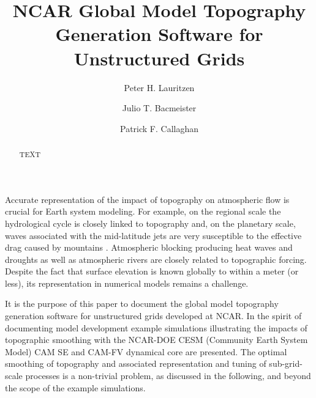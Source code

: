 \documentclass[gmd]{copernicus}
\begin{document}
\linenumbers

\title{NCAR Global Model Topography Generation Software for Unstructured Grids}

\author[1]{Peter H. Lauritzen}
\author[1]{Julio T. Bacmeister}
\author[1]{Patrick F. Callaghan}













\maketitle  %



\begin{abstract}
TEXT
\end{abstract}



\introduction  %
Accurate representation of the impact of topography on atmospheric flow is crucial for Earth system modeling.  For example, on the regional scale the hydrological cycle is closely linked to topography and, on the planetary scale, waves associated with the mid-latitude jets are very susceptible to the effective drag caused by mountains \citep[e.g., ][]{LM1997QJRMS}. Atmospheric blocking producing heat waves and droughts as well as atmospheric rivers are closely related to topographic forcing. Despite the fact that surface elevation is known globally to within a meter (or less), its representation in numerical models remains a challenge.

It is the purpose of this paper to document the global model topography generation software for unstructured grids developed at NCAR. In the spirit of documenting model development example simulations illustrating the impacts of topographic smoothing with the NCAR-DOE CESM (Community Earth System Model) CAM \citep[Community Atmosphere Model; ][]{CAM5} SE \cite[Spectral Element; ][]{HOMME,DetAl2005IJHPCA} and CAM-FV \citep[Finite-Volume; ][]{L2004MWR} dynamical core are presented. The optimal smoothing of topography and associated representation and tuning of sub-grid-scale processes is a non-trivial problem, as discussed in the following, and beyond the scope of the example simulations.
\end{document}
